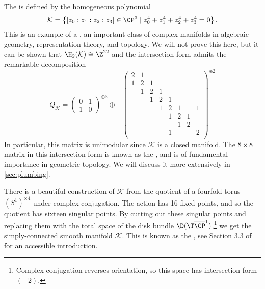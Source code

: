 \begin{example}\label{example:k3}
	The  is defined by the homogeneous polynomial
	\[
		\mathcal{K} = \left\{ [z_0 : z_1 : z_2 : z_3]\in \CP^3 \mid z_0^4 + z_1^4+z_2^4 + z_3^4=0\right\}.
	\]
	This is an example of a , an important class of complex manifolds in algebraic geometry, representation theory, and topology. 
	We will not prove this here, but it can be shown that $\H_2(\mathcal{K})\cong \Z^{22}$ and the intersection form admits the remarkable decomposition
	\[
		Q_{\mathcal{K}} = 
		\begin{pmatrix}
			0 & 1\\ 1 & 0
		\end{pmatrix}^{\oplus 3}\oplus
		-\begin{pmatrix}
			2 & 1 &   &   &   &   &   &   \\
			1 & 2 & 1 &   &   &   &   &   \\
			  & 1 & 2 & 1 &   &   &   &   \\
			  &   & 1 & 2 & 1 &   &   &   \\
			  &   &   & 1 & 2 & 1 &  & 1 \\
			  &   &   &   & 1 & 2 & 1 &  \\
			  &   &   &   &  & 1 & 2 &  \\
			  &   &   &   & 1 &  &  & 2 \\
		\end{pmatrix}^{\oplus 2}
	\]
	In particular, this matrix is unimodular since $\mathcal{K}$ is a closed manifold. The $8\times 8$ matrix in this intersection form is known as the , and is of fundamental importance in geometric topology. We will discuss it more extensively in \cref{sec:plumbing}.
\end{example}

\begin{remark}\label{rmk:kummer-construction}
There is a beautiful construction of $\mathcal{K}$ from the quotient of a fourfold torus $(S^1)^{\times 4}$ under complex conjugation. The action has 16 fixed points, and so the quotient has sixteen singular points. By cutting out these singular points and replacing them with the total space of the disk bundle $\D(\T \overline{\CP}^1)$,\footnote{Complex conjugation reverses orientation, so this space has intersection form $(-2)$.} we get the simply-connected smooth manifold $\mathcal{K}$. This is known as the , see Section 3.3 of \cite{scorpan2005wild} for an accessible introduction.
\end{remark}

